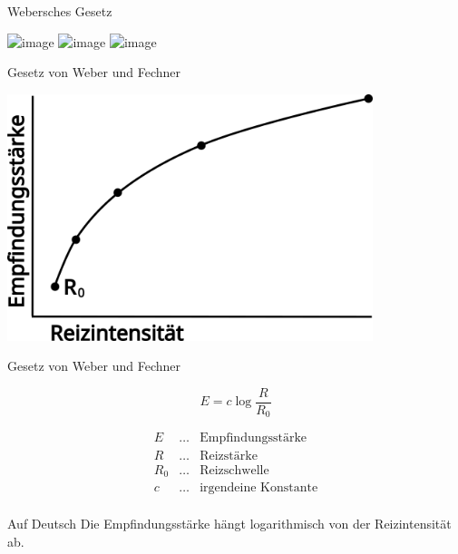 \documentclass{beamer}
\begin{document}
\begin{frame}{Webersches Gesetz}

\begin{center}
    \includegraphics<1>[width=0.8\textwidth]{weber_fechner_1.png}
    \includegraphics<2>[width=0.8\textwidth]{weber_fechner_2.png}
    \includegraphics<3>[width=0.8\textwidth]{weber_fechner_3.png}
\end{center}
    
\end{frame}


\begin{frame}{Gesetz von Weber und Fechner}

\begin{center}
    \includegraphics[width=0.8\textwidth]{weber_fechner.png}
\end{center}
    


\end{frame}


\begin{frame}{Gesetz von Weber und Fechner}

\[
E = c\log \frac{R}{R_0}
\]


\[
\begin{array}{lll}
E           &\ldots    & \text{Empfindungsstärke} \\
R           & \ldots    & \text{Reizstärke} \\
R_0           & \ldots    & \text{Reizschwelle} \\
c           & \ldots    & \text{irgendeine Konstante} \\
\end{array}
\]

\begin{block}{Auf Deutsch}
Die Empfindungsstärke hängt logarithmisch von der Reizintensität ab.
\end{block}

 
\end{frame}
\end{document}
